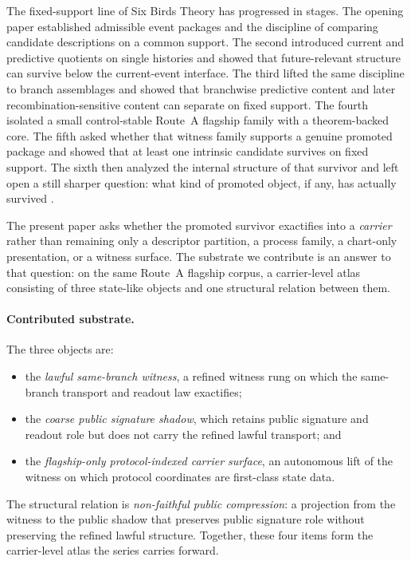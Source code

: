 \documentclass[11pt]{article}
\theoremstyle{definition}
\begin{document}
The fixed-support line of Six Birds Theory has progressed in stages. The opening paper established admissible event packages and the discipline of comparing candidate descriptions on a common support. The second introduced current and predictive quotients on single histories and showed that future-relevant structure can survive below the current-event interface. The third lifted the same discipline to branch assemblages and showed that branchwise predictive content and later recombination-sensitive content can separate on fixed support. The fourth isolated a small control-stable Route~A flagship family with a theorem-backed core. The fifth asked whether that witness family supports a genuine promoted package and showed that at least one intrinsic candidate survives on fixed support. The sixth then analyzed the internal structure of that survivor and left open a still sharper question: what kind of promoted object, if any, has actually survived \citep{Tsiokos2026EventPackages,Tsiokos2026HolonomyMemory,Tsiokos2026MarkingErasureRecombination,Tsiokos2026RecombinationWitnesses,Tsiokos2026PromotionCriteria,Tsiokos2026InternalStructure}.

The present paper asks whether the promoted survivor exactifies into a \emph{carrier} rather than remaining only a descriptor partition, a process family, a chart-only presentation, or a witness surface. The substrate we contribute is an answer to that question: on the same Route~A flagship corpus, a carrier-level atlas consisting of three state-like objects and one structural relation between them.

\paragraph{Contributed substrate.} The three objects are:
\begin{itemize}[leftmargin=2em, itemsep=1pt, topsep=2pt]
\item the \emph{lawful same-branch witness}, a refined witness rung on which the same-branch transport and readout law exactifies;
\item the \emph{coarse public signature shadow}, which retains public signature and readout role but does not carry the refined lawful transport; and
\item the \emph{flagship-only protocol-indexed carrier surface}, an autonomous lift of the witness on which protocol coordinates are first-class state data.
\end{itemize}
The structural relation is \emph{non-faithful public compression}: a projection from the witness to the public shadow that preserves public signature role without preserving the refined lawful structure. Together, these four items form the carrier-level atlas the series carries forward.
\end{document}
